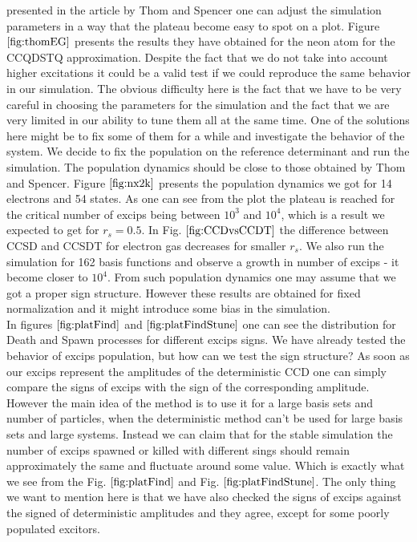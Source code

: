 presented in the article by Thom and Spencer
\cite{spencerDevelopmentsStochasticCoupled2016} one can adjust
the simulation parameters in a way that the plateau become easy to spot on a
plot. Figure $\ref{fig:thomEG}$ presents the results they have obtained
for the neon atom for the CCQDSTQ approximation. Despite the fact that we
do not take into account higher excitations it could be a valid test if
we could reproduce the same behavior in our simulation. The obvious
difficulty here is the fact that we have to be very careful in choosing
the parameters for the simulation and the fact that we are very
limited in our ability to tune them all at the same time. One of the
solutions here might be to fix some of them for a while and
investigate the behavior of the system. We decide to fix the population on
the reference determinant and run the simulation. The population dynamics
should be close to those obtained by Thom and
Spencer. Figure $\ref{fig:nx2k}$ presents the population dynamics we got
for 14 electrons and 54 states. As one can see from the plot the
plateau is reached for the critical number of excips being between
$10^3$ and $10^4$, which is a result we expected to get for 
$r_s=0.5$. In Fig. $\ref{fig:CCDvsCCDT}$ the difference between CCSD
and CCSDT for electron gas decreases for smaller $r_s$. We also run
the simulation for 162 basis functions and observe a growth in number
of excips - it become closer to $10^4$. From such population dynamics
one may assume that we got a proper sign structure. However these
results are obtained for fixed normalization and it might introduce
some bias in the simulation. \\ In figures $\ref{fig:platFind}$ and
$\ref{fig:platFindStune}$ one can see the distribution for Death
and Spawn processes for different excips signs. We have already tested
the behavior of excips population, but how can we test the sign
structure? As soon as our excips represent the amplitudes of the
deterministic CCD one can simply compare the signs of excips with the
sign of the corresponding amplitude. However the main idea of the
method is to use it for a large basis sets and number of particles,
when the deterministic method can't be used for large basis sets and
large systems. Instead we can claim that for the stable simulation the
number of excips spawned or killed with different sings should remain
approximately the same and fluctuate around some value. Which is
exactly what we see from the Fig. $\ref{fig:platFind}$ and
Fig. $\ref{fig:platFindStune}$. The only thing we want to mention here
is that we have also checked the signs of excips against the signed of
deterministic amplitudes and they agree, except for some poorly
populated excitors.\\


